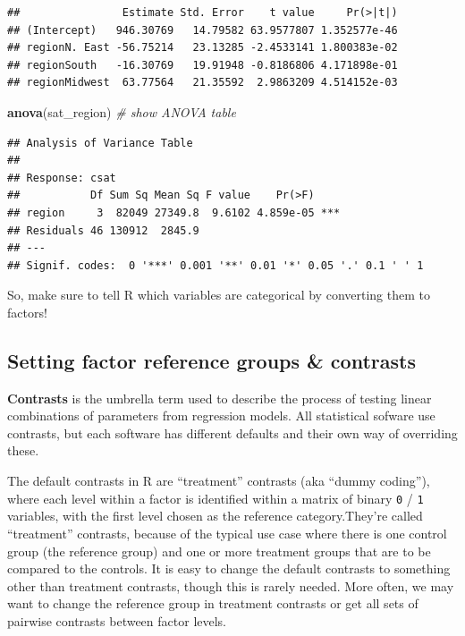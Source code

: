\documentclass[]{book}
\newenvironment{Shaded}{\begin{snugshade}}{\end{snugshade}}
\newcommand{\CommentTok}[1]{\textcolor[rgb]{0.56,0.35,0.01}{\textit{#1}}}
\newcommand{\KeywordTok}[1]{\textcolor[rgb]{0.13,0.29,0.53}{\textbf{#1}}}
\newcommand{\NormalTok}[1]{#1}
\begin{document}
\begin{verbatim}
##                Estimate Std. Error    t value     Pr(>|t|)
## (Intercept)   946.30769   14.79582 63.9577807 1.352577e-46
## regionN. East -56.75214   23.13285 -2.4533141 1.800383e-02
## regionSouth   -16.30769   19.91948 -0.8186806 4.171898e-01
## regionMidwest  63.77564   21.35592  2.9863209 4.514152e-03
\end{verbatim}

\begin{Shaded}
\begin{Highlighting}[]
  \KeywordTok{anova}\NormalTok{(sat_region) }\CommentTok{# show ANOVA table}
\end{Highlighting}
\end{Shaded}

\begin{verbatim}
## Analysis of Variance Table
## 
## Response: csat
##           Df Sum Sq Mean Sq F value    Pr(>F)    
## region     3  82049 27349.8  9.6102 4.859e-05 ***
## Residuals 46 130912  2845.9                      
## ---
## Signif. codes:  0 '***' 0.001 '**' 0.01 '*' 0.05 '.' 0.1 ' ' 1
\end{verbatim}

So, make sure to tell R which variables are categorical by converting them to factors!

\hypertarget{setting-factor-reference-groups-contrasts}{%
\subsection{Setting factor reference groups \& contrasts}\label{setting-factor-reference-groups-contrasts}}

\textbf{Contrasts} is the umbrella term used to describe the process of testing linear combinations of parameters from regression models. All statistical sofware use contrasts, but each software has different defaults and their own way of overriding these.

The default contrasts in R are ``treatment'' contrasts (aka ``dummy coding''), where each level within a factor is identified within a matrix of binary \texttt{0} / \texttt{1} variables, with the first level chosen as the reference category.They're called ``treatment'' contrasts, because of the typical use case where there is one control group (the reference group) and one or more treatment groups that are to be compared to the controls. It is easy to change the default contrasts to something other than treatment contrasts, though this is rarely needed. More often, we may want to change the reference group in treatment contrasts or get all sets of pairwise contrasts between factor levels.
\end{document}
